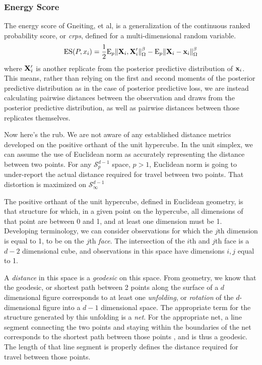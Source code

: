 \subsubsection{Energy Score}
The energy score of Gneiting, et al\cite{gneiting2007}, is a generalization of the continuous ranked
  probability score, or \emph{crps}, defined for a multi-dimensional random variable.
  \begin{equation}
    \label{eq:es}
    \text{ES}(P,x_i) = \frac{1}{2}\text{E}_p\lVert {\bf X}_i,{\bf X}_i^{\prime}\rVert_{\Omega}^{\beta} -
                            \text{E}_p\lVert {\bf X}_i - {\bf x}_i\rVert_{\Omega}^{\beta}
  \end{equation}
  where ${\bf X}_i^{\prime}$ is another replicate from the posterior predictive distribution
  of ${\bf x}_i$. This means, rather than relying on the first and second moments of the posterior
  predictive distribution as in the case of posterior predictive loss\cite{gelfand1998}, we are
  instead calculating pairwise distances between the observation and draws from the posterior
  predictive distribution, as well as pairwise distances between those replicates themselves.

Now here's the rub.  We are not aware of any established distance metrics developed on the
  positive orthant of the unit hypercube.  In the unit simplex, we can assume the use of
  Euclidean norm as accurately representing the distance between two points.  For any
  $\mathcal{S}_{p}^{d-1}$ space, $p > 1$, Euclidean norm is going to under-report the actual distance
  required for travel between two points.  That distortion is maximized on
  $\mathcal{S}_{\infty}^{d-1}$

The positive orthant of the unit hypercube, defined in Euclidean geometry, is that structure for
  which, in a given point on the hypercube, all dimensions of that point are between 0 and 1, and
  at least one dimension must be 1.  Developing terminology, we can consider observations for which
  the $j$th dimension is equal to 1, to be on the $j$th \emph{face}.  The intersection of the $i$th
  and $j$th face is a $d-2$ dimensional cube, and observations in this space have dimensions $i,j$
  equal to 1.

A \emph{distance} in this space is a \emph{geodesic} on this space. From geometry, we know that
  the geodesic, or shortest path between 2 points along the surface of a $d$ dimensional figure
  corresponds to at least one \emph{unfolding}, or \emph{rotation} of the $d$-dimensional
  figure into a $d-1$ dimensional space.  The appropriate term for the structure generated by this
  unfolding is a \emph{net}.  For the appropriate net, a line segment connecting the two points and
  staying within the boundaries of the net corresponds to the shortest path between those points
  , and is thus a geodesic.  The length of that line segment is properly
  defines the distance required for travel between those points.

